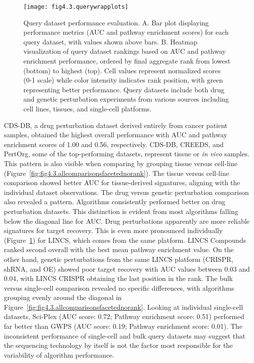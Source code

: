 \begin{figure}[htbp]
    \centering
    \texttt{[image: fig4.3.querywrapplots]}
    \caption[Query dataset performance evaluation.]{Query dataset performance evaluation. A. Bar plot displaying performance metrics (\gls{AUC} and pathway enrichment scores) for each query dataset, with values shown above bars. B. Heatmap visualization of query dataset rankings based on AUC and pathway enrichment performance, ordered by final aggregate rank from lowest (bottom) to highest (top). Cell values represent normalized scores (0-1 scale) while color intensity indicates rank position, with green representing better performance. Query datasets include both drug and genetic perturbation experiments from various sources including cell lines, tissues, and single-cell platforms.}
    \label{fig:fig4.3.querywrapplots}
\end{figure}

\gls{CDS-DB}, a drug perturbation dataset derived entirely from cancer patient samples, obtained the highest overall performance with \gls{AUC} and pathway enrichment scores of 1.00 and 0.56, respectively. \gls{CDS-DB}, \gls{CREEDS}, and PertOrg, some of the top-performing datasets, represent tissue or \textit{in vivo} samples.
This pattern is also visible when comparing by grouping tissue versus cell-line (Figure~\ref{fig:fig4.3.allcomparisonsfacetednorank}).
The tissue versus cell-line comparison showed better \gls{AUC} for tissue-derived signatures, aligning with the individual dataset observations.
The drug versus genetic perturbation comparison also revealed a pattern.
Algorithms consistently performed better on drug perturbation datasets.
This distinction is evident from most algorithms falling below the diagonal line for \gls{AUC}.
Drug perturbations apparently are more reliable signatures for target recovery.
This is even more pronounced individually (Figure~\ref{fig:fig4.3.querywrapplots}) for \gls{LINCS}, which comes from the same platform. \gls{LINCS} Compounds ranked second overall with the best mean pathway enrichment value.
On the other hand, genetic perturbations from the same \gls{LINCS} platform (\gls{CRISPR}, shRNA, and \gls{OE}) showed poor target recovery with \gls{AUC} values between 0.03 and 0.04, with \gls{LINCS} \gls{CRISPR} obtaining the last position in the rank. 
The bulk versus single-cell comparison revealed no specific differences, with algorithms grouping evenly around the diagonal in Figure~\ref{fig:fig4.3.allcomparisonsfacetednorank}.
Looking at individual single-cell datasets, Sci-Plex (\gls{AUC} score: 0.72; Pathway enrichment score: 0.51) performed far better than \gls{GWPS} (\gls{AUC} score: 0.19; Pathway enrichment score: 0.01).
The inconsistent performance of single-cell and bulk query datasets may suggest that the sequencing technology by itself is not the factor most responsible for the variability of algorithm performance.

